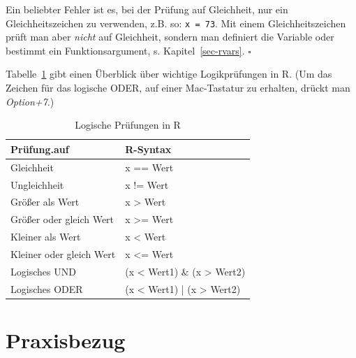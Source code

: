 \documentclass[
  a4paper,
]{scrbook}
\theoremstyle{definition}
\theoremstyle{definition}
\theoremstyle{definition}
\theoremstyle{remark}
\begin{document}
\begin{tcolorbox}[enhanced jigsaw, colbacktitle=quarto-callout-caution-color!10!white, bottomrule=.15mm, left=2mm, breakable, rightrule=.15mm, coltitle=black, title=\textcolor{quarto-callout-caution-color}{\faFire}\hspace{0.5em}{Vorsicht}, colback=white, leftrule=.75mm, titlerule=0mm, opacityback=0, bottomtitle=1mm, toprule=.15mm, arc=.35mm, toptitle=1mm, opacitybacktitle=0.6, colframe=quarto-callout-caution-color-frame]

Ein beliebter Fehler ist es, bei der Prüfung auf Gleichheit, nur ein
Gleichheitszeichen zu verwenden, z.B. so: \texttt{x\ =\ 73}. Mit einem
Gleichheitszeichen prüft man aber \emph{nicht} auf Gleichheit, sondern
man definiert die Variable oder bestimmt ein Funktionsargument, s.
Kapitel~\ref{sec-rvars}. \(\square\)

\end{tcolorbox}

Tabelle~\ref{tbl-lgl} gibt einen Überblick über wichtige Logikprüfungen
in R. (Um das Zeichen für das logische ODER, \texttt{\textbar{}} auf
einer Mac-Tastatur zu erhalten, drückt man \emph{Option+7}.)

\begin{longtable}{ll}

\caption{\label{tbl-lgl}Logische Prüfungen in R}

\tabularnewline

\toprule
Prüfung.auf & R-Syntax \\ 
\midrule\addlinespace[2.5pt]
Gleichheit & x == Wert \\ 
Ungleichheit & x != Wert \\ 
Größer als Wert & x > Wert \\ 
Größer oder gleich Wert & x >= Wert \\ 
Kleiner als Wert & x < Wert \\ 
Kleiner oder gleich Wert & x <= Wert \\ 
Logisches UND & (x < Wert1) \& (x > Wert2) \\ 
Logisches ODER & (x < Wert1) | (x > Wert2) \\ 
\bottomrule

\end{longtable}

\section{Praxisbezug}\label{praxisbezug-1}
\end{document}
